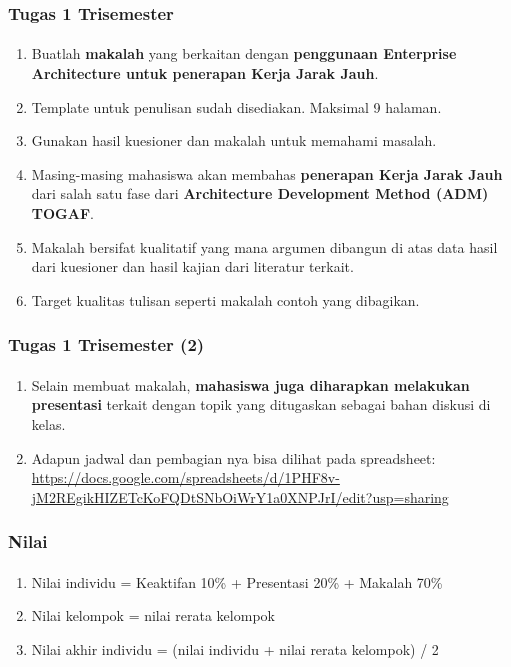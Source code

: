 \documentclass[aspectratio=169, table]{beamer}
\begin{document}
	\begin{frame}
		\frametitle{Tugas 1 Trisemester}
		\framesubtitle{\hspace{1cm}}
		\begin{enumerate}
			\item Buatlah \textbf{makalah} yang berkaitan dengan \textbf{penggunaan Enterprise Architecture untuk penerapan Kerja Jarak Jauh}.
			\item Template untuk penulisan sudah disediakan. Maksimal 9 halaman. 
			\item Gunakan hasil kuesioner dan makalah untuk memahami masalah.
			\item Masing-masing mahasiswa akan membahas \textbf{penerapan Kerja Jarak Jauh} dari salah satu fase dari \textbf{Architecture Development Method (ADM) TOGAF}.
			\item Makalah bersifat kualitatif yang mana argumen dibangun di atas data hasil dari kuesioner dan hasil kajian dari literatur terkait.
			\item Target kualitas tulisan seperti makalah contoh yang dibagikan.
		\end{enumerate}
	\end{frame}
	
	\begin{frame}
		\frametitle{Tugas 1 Trisemester (2)}
		\framesubtitle{\hspace{1cm}}
		\begin{enumerate}
			\item Selain membuat makalah, \textbf{mahasiswa juga diharapkan melakukan presentasi} terkait dengan topik yang ditugaskan sebagai bahan diskusi di kelas. 
			\item Adapun jadwal dan pembagian nya bisa dilihat pada spreadsheet:  \url{https://docs.google.com/spreadsheets/d/1PHF8v-jM2REgikHIZETcKoFQDtSNbOiWrY1a0XNPJrI/edit?usp=sharing}
		\end{enumerate}
	\end{frame}
	
	\begin{frame}
		\frametitle{Nilai}
		\framesubtitle{\hspace{1cm}}
		\begin{enumerate}
			\item Nilai individu = Keaktifan 10\% + Presentasi 20\% + Makalah 70\%
			\item Nilai kelompok = nilai rerata kelompok
			\item Nilai akhir individu = (nilai individu + nilai rerata kelompok) / 2
		\end{enumerate}
	\end{frame}
	
\end{document}
